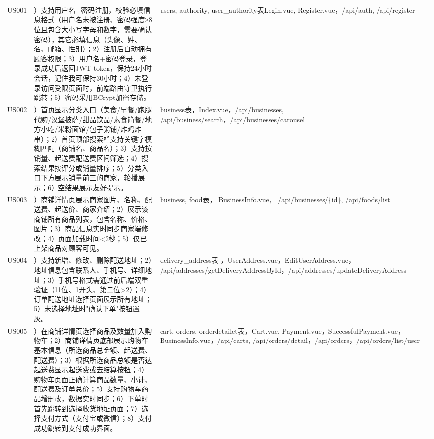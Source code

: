 \begin{levellist}
\begin{levellist}
\begin{longtable}{>{\centering\arraybackslash}m{2.3cm} >{\centering\arraybackslash}m{8.5cm} >{\centering\arraybackslash}m{4cm}}
            US001           & 1）支持用户名+密码注册，校验必填信息格式（用户名未被注册、密码强度≥8位且包含大小写字母和数字，需要确认密码），其它必填信息（头像、姓、名、邮箱、性别）；2）注册后自动拥有顾客权限；3）用户名+密码登录，登录成功后返回JWT token，保持24小时会话，记住我可保持30小时；4）未登录访问受限页面时，前端路由守卫执行跳转；5）密码采用BCrypt加密存储。     & users, authority, user\_authority表Login.vue, Register.vue，/api/auth, /api/register                                                                         \\
            US002           & 1）首页显示分类入口（美食/早餐/跑腿代购/汉堡披萨/甜品饮品/素食简餐/地方小吃/米粉面馆/包子粥铺/炸鸡炸串）；2）首页顶部搜索栏支持关键字模糊匹配（商铺名、商品名）；3）支持按销量、起送费配送费区间筛选；4）搜索结果按评分或销量排序；5）分类入口下方展示销量前三的商家，轮播展示；6）空结果展示友好提示。                               & business表，Index.vue，/api/businesses, /api/business/search，/api/businesses/carousel                                                                         \\
            US003           & 1）商铺详情页展示商家图片、名称、配送费、起送价、商家介绍；2）展示该商铺所有商品列表，包含名称、价格、图片；3）商品信息实时同步商家端修改；4）页面加载时间\textless{}2秒；5）仅已上架商品对顾客可见。                                                                               & business, food表， BusinessInfo.vue， /api/businesses/\{id\}, /api/foods/list                                                                                 \\
            US004           & 1）支持新增、修改、删除配送地址；2）地址信息包含联系人、手机号、详细地址；3）手机号格式需通过前后端双重验证（11位、1开头、第二位\textgreater{}2）；4）订单配送地址选择页面展示所有地址；5）未选择地址时"确认下单"按钮置灰。                                                                & delivery\_address表 ，UserAddress.vue，EditUserAddress.vue，     /api/addresses/getDeliveryAddressById，/api/addresses/updateDeliveryAddress                    \\
            US005           & 1）在商铺详情页选择商品及数量加入购物车；2）商铺详情页底部展示购物车基本信息（所选商品总金额、起送费、配送费）；3）根据所选商品总额是否达起送费显示起送费或去结算按钮；4）购物车页面正确计算商品数量、小计、配送费及订单总价；5）支持购物车商品增删改，数据实时同步；6）下单时首先跳转到选择收货地址页面；7）选择支付方式（支付宝或微信）；8）支付成功跳转到支付成功界面。 & cart, orders, orderdetailet表，Cart.vue, Payment.vue，SuccessfulPayment.vue，BusinessInfo.vue，/api/carts, /api/orders/detail，/api/orders，/api/orders/list/user \\
        \end{longtable}



\end{levellist}
\end{levellist}
